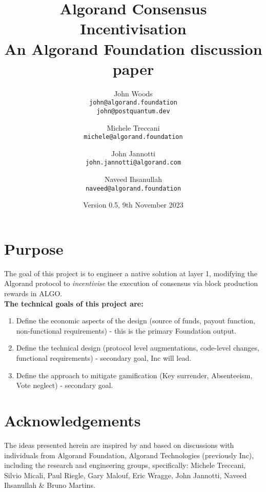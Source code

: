\documentclass[11pt,a4paper]{article}
\begin{document}
\title {Algorand Consensus Incentivisation \\
       {\large \sc An Algorand Foundation discussion paper}}
\date  {Version 0.5, 9th November 2023}
\author{
    John Woods \\ 
    {\small \texttt{john@algorand.foundation}} \\
    {\small \texttt{john@postquantum.dev}} \\
\and 
    Michele Treccani \\
    {\small \texttt{michele@algorand.foundation}}
\and 
    John Jannotti \\
    {\small \texttt{john.jannotti@algorand.com}}
\and 
    Naveed Ihsanullah \\
    {\small \texttt{naveed@algorand.foundation}}
}

\maketitle

\section{Purpose}
The goal of this project is to engineer a native solution at layer 1, modifying the Algorand protocol to 
\emph{incentivise} the execution of consensus via block production rewards in ALGO. \\

\textbf{The technical goals of this project are:}

\begin{enumerate}
    \item Define the economic aspects of the design (source of funds, payout function, non-functional requirements) - 
        this is the primary Foundation output.
    \item Define the technical design (protocol level augmentations, code-level changes, functional requirements) 
        - secondary goal, Inc will lead.
    \item Define the approach to mitigate gamification (Key surrender, Absenteeism, Vote neglect) - secondary goal.
\end{enumerate}

\pagebreak

\tableofcontents

\pagebreak

\section{Acknowledgements}
The ideas presented herein are inspired by and based on discussions with individuals from Algorand Foundation, 
Algorand Technologies (previously Inc), including the research and engineering groups, specifically: Michele Treccani, 
Silvio Micali, Paul Riegle, Gary Malouf, Eric Wragge, John Jannotti, Naveed Ihsanullah \& Bruno Martins.
\end{document}
